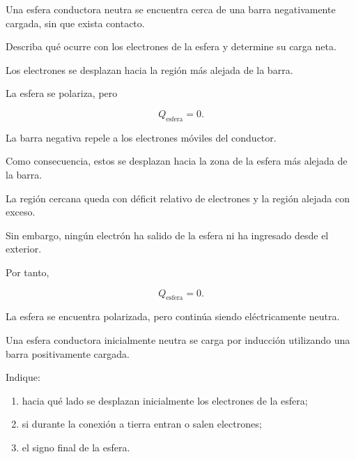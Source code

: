 \begin{ejercicio}

Una esfera conductora neutra se encuentra cerca de una barra negativamente
cargada, sin que exista contacto.

Describa qué ocurre con los electrones de la esfera y determine su carga
neta.

\end{ejercicio}

\begin{respuesta}

Los electrones se desplazan hacia la región más alejada de la barra.

La esfera se polariza, pero

\[
\boxed{
Q_{\text{esfera}}=0
}.
\]

\end{respuesta}

\begin{explicacion}

La barra negativa repele a los electrones móviles del conductor.

Como consecuencia, estos se desplazan hacia la zona de la esfera más alejada
de la barra.

La región cercana queda con déficit relativo de electrones y la región
alejada con exceso.

Sin embargo, ningún electrón ha salido de la esfera ni ha ingresado desde el
exterior.

Por tanto,

\[
\boxed{
Q_{\text{esfera}}=0
}.
\]

La esfera se encuentra polarizada, pero continúa siendo eléctricamente
neutra.

\end{explicacion}



\begin{ejercicio}

Una esfera conductora inicialmente neutra se carga por inducción utilizando
una barra positivamente cargada.

Indique:

\begin{enumerate}
    \item hacia qué lado se desplazan inicialmente los electrones de la
    esfera;
    \item si durante la conexión a tierra entran o salen electrones;
    \item el signo final de la esfera.
\end{enumerate}

\end{ejercicio}

